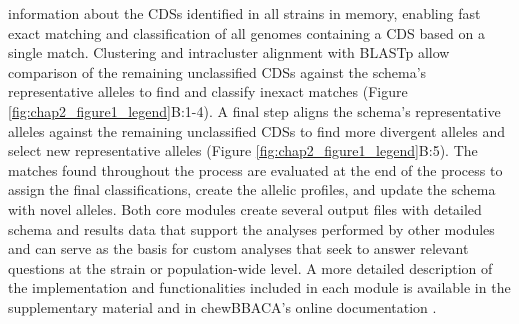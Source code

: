 information about the \ac{CDSs} identified in all strains in memory, enabling fast exact matching and classification of all genomes containing a \ac{CDS} based on a single match. Clustering and intracluster alignment with \ac{BLASTp} allow comparison of the remaining unclassified \ac{CDSs} against the schema's representative alleles to find and classify inexact matches (Figure \ref{fig:chap2_figure1_legend}B:1-4). A final step aligns the schema's representative alleles against the remaining unclassified \ac{CDSs} to find more divergent alleles and select new representative alleles (Figure \ref{fig:chap2_figure1_legend}B:5). The matches found throughout the process are evaluated at the end of the process to assign the final classifications, create the allelic profiles, and update the schema with novel alleles. Both core modules create several output files with detailed schema and results data that support the analyses performed by other modules and can serve as the basis for custom analyses that seek to answer relevant questions at the strain or population-wide level.
A more detailed description of the implementation and functionalities included in each module is available in the supplementary material and in chewBBACA’s online documentation \citep{noauthor_chewbbaca_nodate}.

